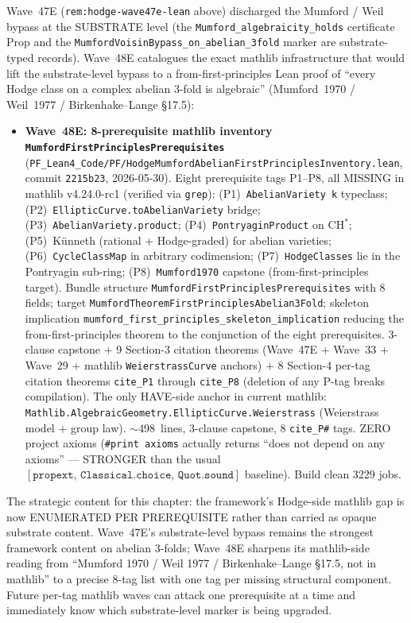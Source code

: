 \begin{remark}\label{rem:hodge-wave48e-lean}
Wave~47E (\texttt{rem:hodge-wave47e-lean} above) discharged the Mumford / Weil bypass at the SUBSTRATE level (the \texttt{Mumford\_algebraicity\_holds} certificate Prop and the \texttt{MumfordVoisinBypass\_on\_abelian\_3fold} marker are substrate-typed records). Wave~48E catalogues the exact mathlib infrastructure that would lift the substrate-level bypass to a from-first-principles Lean proof of ``every Hodge class on a complex abelian 3-fold is algebraic'' (Mumford~1970 / Weil~1977 / Birkenhake--Lange \S 17.5):
\begin{itemize}
  \item \textbf{Wave~48E: 8-prerequisite mathlib inventory \texttt{MumfordFirstPrinciplesPrerequisites}} (\texttt{PF\_Lean4\_Code/PF/HodgeMumfordAbelianFirstPrinciplesInventory.lean}, commit \texttt{2215b23}, 2026-05-30). Eight prerequisite tags P1--P8, all MISSING in mathlib v4.24.0-rc1 (verified via \texttt{grep}): (P1)~\texttt{AbelianVariety k} typeclass; (P2)~\texttt{EllipticCurve.toAbelianVariety} bridge; (P3)~\texttt{AbelianVariety.product}; (P4)~\texttt{PontryaginProduct} on $\mathrm{CH}^*$; (P5)~K\"unneth (rational + Hodge-graded) for abelian varieties; (P6)~\texttt{CycleClassMap} in arbitrary codimension; (P7)~\texttt{HodgeClasses} lie in the Pontryagin sub-ring; (P8)~\texttt{Mumford1970} capstone (from-first-principles target). Bundle structure \texttt{MumfordFirstPrinciplesPrerequisites} with 8 fields; target \texttt{MumfordTheoremFirstPrinciplesAbelian3Fold}; skeleton implication \texttt{mumford\_first\_principles\_skeleton\_implication} reducing the from-first-principles theorem to the conjunction of the eight prerequisites. 3-clause capstone $+$ 9 Section-3 citation theorems (Wave~47E + Wave~33 + Wave~29 + mathlib \texttt{WeierstrassCurve} anchors) $+$ 8 Section-4 per-tag citation theorems \texttt{cite\_P1} through \texttt{cite\_P8} (deletion of any P-tag breaks compilation). The only HAVE-side anchor in current mathlib: \texttt{Mathlib.AlgebraicGeometry.EllipticCurve.Weierstrass} (Weierstrass model + group law). $\sim$498~lines, 3-clause capstone, 8 \texttt{cite\_P\#} tags. ZERO project axioms (\texttt{\#print axioms} actually returns ``does not depend on any axioms'' --- STRONGER than the usual $[\texttt{propext, Classical.choice, Quot.sound}]$ baseline). Build clean 3229 jobs.
\end{itemize}
The strategic content for this chapter: the framework's Hodge-side mathlib gap is now ENUMERATED PER PREREQUISITE rather than carried as opaque substrate content. Wave~47E's substrate-level bypass remains the strongest framework content on abelian 3-folds; Wave~48E sharpens its mathlib-side reading from ``Mumford 1970 / Weil 1977 / Birkenhake--Lange \S 17.5, not in mathlib'' to a precise 8-tag list with one tag per missing structural component. Future per-tag mathlib waves can attack one prerequisite at a time and immediately know which substrate-level marker is being upgraded.


\end{remark}
